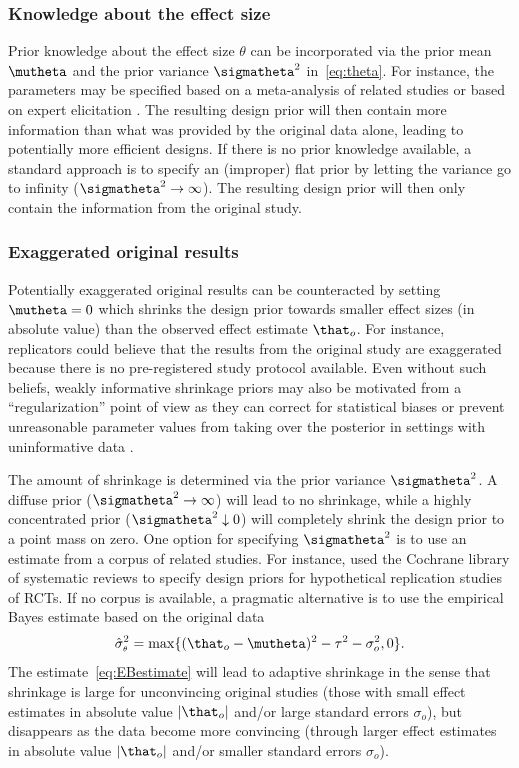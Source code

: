 \subsubsection{Knowledge about the effect size}
Prior knowledge about the effect size $\theta$ can be incorporated via the prior
mean $\mutheta$ and the prior variance $\sigmatheta^2$ in~\eqref{eq:theta}. For
instance, the parameters may be specified based on a meta-analysis of related
studies \citep{McKinney2021} or based on expert elicitation \citep{OHagan2019}.
The resulting design prior will then contain more information than what was
provided by the original data alone, leading to potentially more efficient
designs. If there is no prior knowledge available, a standard approach is to
specify an (improper) flat prior by letting the variance go to infinity
($\sigmatheta^2 \to \infty$). The resulting design prior will then only contain
the information from the original study.

\subsubsection{Exaggerated original results}
\label{sec:shrinkage}
Potentially exaggerated original results can be counteracted by setting
$\mutheta = 0$ which shrinks the design prior towards smaller effect sizes (in
absolute value) than the observed effect estimate $\that_{o}$. For instance,
replicators could believe that the results from the original study are
exaggerated because there is no pre-registered study protocol available. Even
without such beliefs, weakly informative shrinkage priors may also be motivated
from a ``regularization'' point of view as they can correct for statistical
biases \citep{Copas1983, Firth1993} or prevent unreasonable parameter values
from taking over the posterior in settings with uninformative data
\citep{Gelman2009}.

The amount of shrinkage is determined via the prior variance $\sigmatheta^2$. A
diffuse prior ($\sigmatheta^2 \to \infty$) will lead to no shrinkage, while a
highly concentrated prior ($\sigmatheta^2 \downarrow 0$) will completely shrink
the design prior to a point mass on zero. One option for specifying
$\sigmatheta^2$ is to use an estimate from a corpus of related studies. For
instance, \citet{vanZwet2021} used the Cochrane library of systematic reviews to
specify design priors for hypothetical replication studies of RCTs. If no corpus
is available, a pragmatic alternative is to use the empirical Bayes estimate
based on the original data
\begin{align}
  \label{eq:EBestimate}
  \hat{\sigma}^2_{\scriptscriptstyle{\theta}} = \max\{(\that_{o} - \mutheta)^{2} - \tau^{2} - \sigma^{2}_{o}, 0\}.
\end{align}
The estimate~\eqref{eq:EBestimate} will lead to adaptive shrinkage
\citep{Pawel2020} in the sense that shrinkage is large for unconvincing original
studies (those with small effect estimates in absolute value $|\that_{o}|$
and/or large standard errors $\sigma_{o}$), but disappears as the data become
more convincing (through larger effect estimates in absolute value $|\that_{o}|$
and/or smaller standard errors $\sigma_{o}$).




